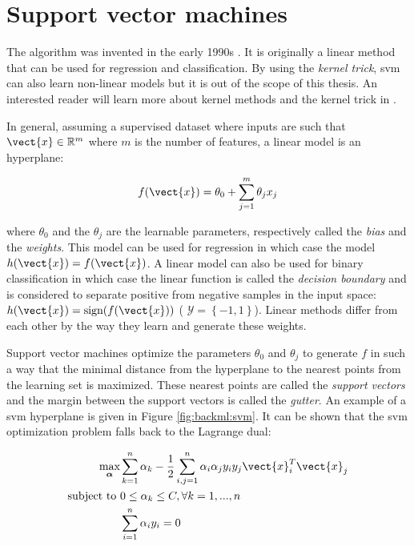 
\section{Support vector machines}
\label{sec:backml:svm}

The  algorithm was invented in the early 1990s \parencite{boser1992training}.
It is originally a linear method that can be used for regression and classification.
By using the \textit{kernel trick}, \acrshort{svm} can also learn non-linear models
but it is out of the scope of this thesis. An interested reader will learn more
about kernel methods and the kernel trick in \parencite{friedman2017elements}.

In general, assuming a supervised dataset where inputs are such that
$\vect{x} \in \mathbb{R}^m$ where $m$ is the number of features, a linear model
is an hyperplane:

\begin{equation}
\label{eqn:backml:linearmodel}
f(\vect{x}) = \theta_0 + \sum_{j=1}^m \theta_j x_j
\end{equation}

where $\theta_0$ and the $\theta_j$ are the learnable parameters, respectively
called the \textit{bias} and the \textit{weights}. This model can be used for
regression in which case the model $h(\vect{x}) = f(\vect{x})$. A linear model
can also be used for binary classification in which case the linear function is
called the \textit{decision boundary} and is considered to separate positive from
negative samples in the input space: $h(\vect{x}) = \text{sign}(f(\vect{x}))$ (\ie
$\mathcal{Y} = \left\{-1, 1\right\}$). Linear methods differ from each other by
the way they learn and generate these weights.

Support vector machines optimize the parameters $\theta_0$ and $\theta_j$ to
generate $f$ in such a way that the minimal distance from the hyperplane to the
nearest points from the learning set is maximized. These nearest points are called
the \textit{support vectors} and the margin between the support vectors is called
the \textit{gutter}. An example of a \acrshort{svm} hyperplane is given in Figure
\ref{fig:backml:svm}. It can be shown that the \acrshort{svm} optimization problem
falls back to the Lagrange dual:

\begin{align}
\label{eqn:backml:svmoptimizationproblem}
\underset{\boldsymbol{\alpha}}{\text{max}}& \sum_{k=1}^n \alpha_k - \frac{1}{2} \sum_{i,j=1}^n \alpha_i\alpha_j y_i y_j \vect{x}_i^T \vect{x}_j \\
\text{subject to}~& 0 \leq \alpha_k \leq C, \forall k = 1, ..., n \\
& \sum_{i=1}^n \alpha_i y_i = 0
\end{align}

